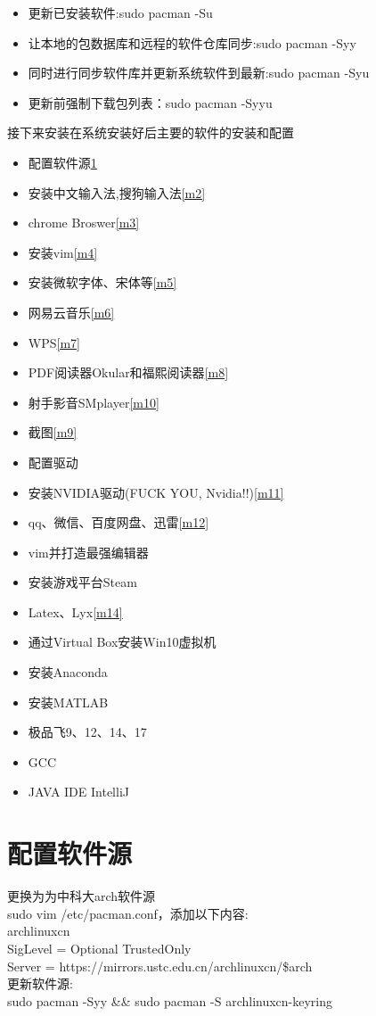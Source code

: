 \documentclass[utf8]{book}
\begin{document}
\begin{appendices}
\begin{itemize}
		\item 更新已安装软件:sudo pacman -Su
		\item 让本地的包数据库和远程的软件仓库同步:sudo pacman -Syy
		\item 同时进行同步软件库并更新系统软件到最新:sudo pacman -Syu
		\item 更新前强制下载包列表：sudo pacman -Syyu
	\end{itemize}

	接下来安装在系统安装好后主要的软件的安装和配置
	
	\begin{itemize}
		\item 配置软件源\ref{m1}
		\item 安装中文输入法,搜狗输入法\ref{m2}
		\item chrome Broswer\ref{m3}
		\item 安装vim\ref{m4}
		\item 安装微软字体、宋体等\ref{m5}
		\item 网易云音乐\ref{m6}
		\item WPS\ref{m7}

		\item PDF阅读器Okular和福熙阅读器\ref{m8}
		\item 射手影音SMplayer\ref{m10}
		\item 截图\ref{m9}
		\item 配置驱动
		\item 安装NVIDIA驱动(FUCK YOU, Nvidia!!)\ref{m11}
		\item qq、微信、百度网盘、迅雷\ref{m12}
		\item vim并打造最强编辑器
		\item 安装游戏平台Steam
		\item Latex、Lyx\ref{m14}
		\item 通过Virtual Box安装Win10虚拟机
		\item 安装Anaconda
		\item 安装MATLAB
		\item 极品飞9、12、14、17
		\item GCC
		\item JAVA IDE IntelliJ
	\end{itemize}

	\section{配置软件源}\label{m1}
	更换为为中科大arch软件源\\
	sudo vim /etc/pacman.conf，添加以下内容:\\
	\lbrack archlinuxcn\rbrack \\
	SigLevel = Optional TrustedOnly\\
	Server = https://mirrors.ustc.edu.cn/archlinuxcn/\$arch\\
	更新软件源:\\
	sudo pacman -Syy  \&\&  sudo pacman -S archlinuxcn-keyring

\end{appendices}
\end{document}
